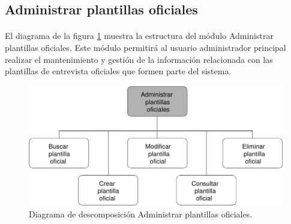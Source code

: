 \subsection{Administrar plantillas oficiales}

  \paragraph{}El diagrama de la figura
  \ref{diagramaDescomposicionAdministrarPlantillasOficiales} muestra la
  estructura del módulo Administrar plantillas oficiales. Este módulo permitirá
  al usuario administrador principal realizar el mantenimiento y gestión de la
  información relacionada con las plantillas de entrevista oficiales que formen
  parte del sistema.

  \begin{figure}[!ht]
    \begin{center}
      \includegraphics[]{11.Disenyo_Arquitectonico/11.2.Diagramas_Descomposicion/11.2.2.Modulo_administrador_principal/AdministrarBBDD/AdministrarPlantillasOficiales/Diagramas/administrar_plantillas_oficiales.pdf}
      \caption{Diagrama de descomposición Administrar plantillas oficiales.}
      \label{diagramaDescomposicionAdministrarPlantillasOficiales}
    \end{center}
  \end{figure}
